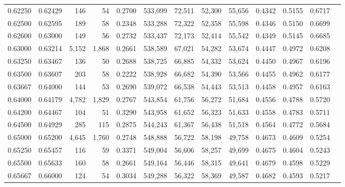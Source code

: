 \begin{tabular}{rrrrrrrrrrrrr}
0.62250 & 0.62429 &    146 &    54 &                                     0.2700 & 533,099 &  72,511 &  52,300 &  55,656 & 0.4342 & 0.5155 & 0.6717 \\
0.62500 & 0.62595 &    189 &    58 &                                     0.2348 & 533,288 &  72,322 &  52,358 &  55,598 & 0.4346 & 0.5150 & 0.6699 \\
0.62600 & 0.63000 &    149 &    56 &                                     0.2732 & 533,437 &  72,173 &  52,414 &  55,542 & 0.4349 & 0.5145 & 0.6685 \\
0.63000 & 0.63214 &  5,152 & 1,868 &                                     0.2661 & 538,589 &  67,021 &  54,282 &  53,674 & 0.4447 & 0.4972 & 0.6208 \\
0.63250 & 0.63467 &    136 &    50 &                                     0.2688 & 538,725 &  66,885 &  54,332 &  53,624 & 0.4450 & 0.4967 & 0.6196 \\
0.63500 & 0.63607 &    203 &    58 &                                     0.2222 & 538,928 &  66,682 &  54,390 &  53,566 & 0.4455 & 0.4962 & 0.6177 \\
0.63667 & 0.64000 &    144 &    53 &                                     0.2690 & 539,072 &  66,538 &  54,443 &  53,513 & 0.4458 & 0.4957 & 0.6163 \\
0.64000 & 0.64179 &  4,782 & 1,829 &                                     0.2767 & 543,854 &  61,756 &  56,272 &  51,684 & 0.4556 & 0.4788 & 0.5720 \\
0.64200 & 0.64467 &    104 &    51 &                                     0.3290 & 543,958 &  61,652 &  56,323 &  51,633 & 0.4558 & 0.4783 & 0.5711 \\
0.64500 & 0.64929 &    285 &   115 &                                     0.2875 & 544,243 &  61,367 &  56,438 &  51,518 & 0.4564 & 0.4772 & 0.5684 \\
0.65000 & 0.65200 &  4,645 & 1,760 &                                     0.2748 & 548,888 &  56,722 &  58,198 &  49,758 & 0.4673 & 0.4609 & 0.5254 \\
0.65250 & 0.65457 &    116 &    59 &                                     0.3371 & 549,004 &  56,606 &  58,257 &  49,699 & 0.4675 & 0.4604 & 0.5243 \\
0.65500 & 0.65633 &    160 &    58 &                                     0.2661 & 549,164 &  56,446 &  58,315 &  49,641 & 0.4679 & 0.4598 & 0.5229 \\
0.65667 & 0.66000 &    124 &    54 &                                     0.3034 & 549,288 &  56,322 &  58,369 &  49,587 & 0.4682 & 0.4593 & 0.5217 \\

\end{tabular}
